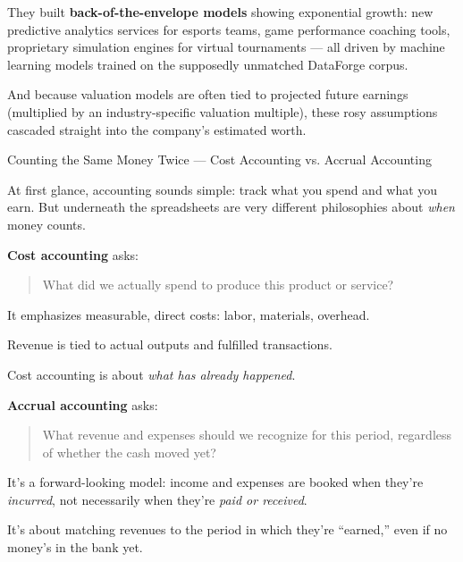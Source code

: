 They built \textbf{back-of-the-envelope models} showing exponential growth: new predictive analytics services for esports teams, game performance coaching tools, proprietary simulation engines for virtual tournaments — all driven by machine learning models trained on the supposedly unmatched DataForge corpus.

And because valuation models are often tied to projected future earnings (multiplied by an industry-specific valuation multiple), these rosy assumptions cascaded straight into the company’s estimated worth.

\medskip

\begin{HistoricalSidebar}{Counting the Same Money Twice — Cost Accounting vs. Accrual Accounting}

At first glance, accounting sounds simple: track what you spend and what you earn.  
But underneath the spreadsheets are very different philosophies about \textit{when} money counts.

\medskip

\textbf{Cost accounting} asks:  

\begin{quote}
What did we actually spend to produce this product or service?
\end{quote}

It emphasizes measurable, direct costs: labor, materials, overhead.  

\medskip

Revenue is tied to actual outputs and fulfilled transactions.  

\medskip

Cost accounting is about \textit{what has already happened}.

\medskip

\textbf{Accrual accounting} asks:  

\begin{quote}
What revenue and expenses should we recognize for this period, regardless of whether the cash moved yet?
\end{quote}

It’s a forward-looking model: income and expenses are booked when they’re \textit{incurred}, not necessarily when they’re \textit{paid or received}.  

\medskip

It’s about matching revenues to the period in which they’re “earned,” even if no money’s in the bank yet.

\medskip


\end{HistoricalSidebar}
